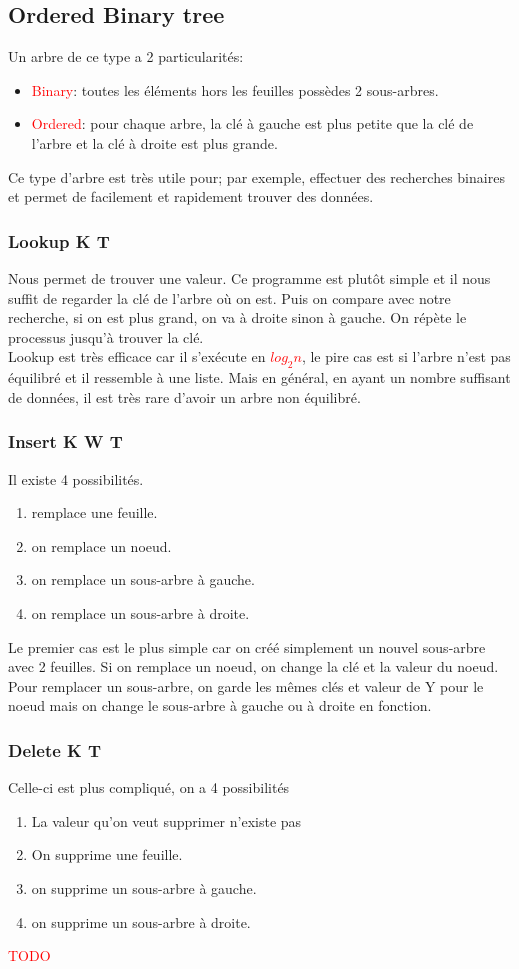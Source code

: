 \documentclass{report}
\begin{document}
\subsection{Ordered Binary tree}
Un arbre de ce type a 2 particularités:
\begin{itemize}
\item \textcolor{red}{Binary}: toutes les éléments hors les feuilles possèdes 2 sous-arbres.
\item \textcolor{red}{Ordered}: pour chaque arbre, la clé à gauche est plus petite que la clé de l'arbre et la clé à droite est plus grande.
\end{itemize}
Ce type d'arbre est très utile pour; par exemple, effectuer des recherches binaires et permet de facilement et rapidement trouver des données.

\subsubsection{Lookup K T}
Nous permet de trouver une valeur. Ce programme est plutôt simple et il nous suffit de regarder la clé de l'arbre où on est. Puis on compare avec notre recherche, si on est plus grand, on va à droite sinon à gauche. On répète le processus jusqu'à trouver la clé.\\
Lookup est très efficace car il s'exécute en \textcolor{red}{$log_2 n$}, le pire cas est si l'arbre n'est pas équilibré et il ressemble à une liste. Mais en général, en ayant un nombre suffisant de données, il est très rare d'avoir un arbre non équilibré.
\subsubsection{Insert K W T}
Il existe 4 possibilités.
\begin{enumerate}
\item remplace une feuille.
\item on remplace un noeud.
\item on remplace un sous-arbre à gauche.
\item on remplace un sous-arbre à droite.
\end{enumerate}
Le premier cas est le plus simple car on créé simplement un nouvel sous-arbre avec 2 feuilles. Si on remplace un noeud, on change la clé et la valeur du noeud.
Pour remplacer un sous-arbre, on garde les mêmes clés et valeur de Y pour le noeud mais on change le sous-arbre à gauche ou à droite en fonction.
\subsubsection{Delete K T}
Celle-ci est plus compliqué, on a 4 possibilités
\begin{enumerate}
\item La valeur qu'on veut supprimer n'existe pas
\item On supprime une feuille.
\item on supprime un sous-arbre à gauche.
\item on supprime un sous-arbre à droite.
\end{enumerate}
\textcolor{red}{TODO} %
\end{document}
